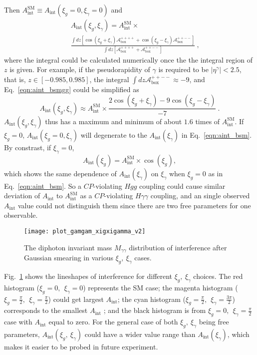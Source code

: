 \documentclass[twocolumn,
prd,amssymb,amsmath,preprintnumbers,
floatfix,aps,nofootinbib]{revtex4-1}
\newcommand{\beq}{\begin{equation}}
\newcommand{\eeq}{\end{equation}}
\newcommand{\bea}{\begin{eqnarray}}
\newcommand{\eea}{\end{eqnarray}}
\begin{document}
Then $A_{\text{int}}^{\text{SM}}\equiv A_{\text{int}}(\xi_g=0,\xi_\gamma=0)$ and
\bea
&& A_{\text{int}}(\xi_g,\xi_\gamma) = A_{\text{int}}^{\text{SM}}\times
\nonumber \\
&& \frac{\int dz[\cos(\xi_g+\xi_\gamma)\mathcal{A}_{\text{box}}^{++++}+\cos(\xi_g-\xi_\gamma)\mathcal{A}_{\text{box}}^{++--}]}{\int dz[\mathcal{A}_{\text{box}}^{++++}+\mathcal{A}_{\text{box}}^{++--}]}~,
\label{eqn:aint_bsmgg}
\eea
where the integral could be calculated numerically once the
the integral region of $z$ is given. For example,
if the pseudorapidity of $\gamma$ is required to be $|\eta^{\gamma}|<2.5$,
that is, $z\in [-0.985,0.985]$,
the integral $\int dz \mathcal{A}_{\text{box}}^{++--}\approx -9$,
and Eq.~\eqref{eqn:aint_bsmgg} could be simplified as
\beq
A_{\text{int}}(\xi_g,\xi_\gamma)\approx A_{\text{int}}^{\text{SM}}\times
\frac{2\cos(\xi_g+\xi_\gamma)-9\cos(\xi_g-\xi_\gamma)}
{-7}~.
\label{eqn:aint_bsmgg2}
\eeq
$A_{\text{int}}(\xi_g,\xi_\gamma)$ thus has a maximum and minimum
of about $1.6$ times of $A_{\text{int}}^{\text{SM}}$.
If $\xi_g=0$, $A_{\text{int}}(\xi_g=0,\xi_\gamma)$ will degenerate to the
$A_{\text{int}}(\xi_\gamma)$ in Eq.~\eqref{eqn:aint_bsm}.
By constrast, if $\xi_\gamma=0$,
\beq
A_{\text{int}}(\xi_g)= A_{\text{int}}^{\text{SM}}\times \cos(\xi_g),
\eeq
which shows the same dependence of $A_{\text{int}}(\xi_\gamma)$
on $\xi_\gamma$ when $\xi_g=0$ as in Eq.~\eqref{eqn:aint_bsm}.
So a $CP$-violating $Hgg$ coupling could cause similar deviation of
$A_{\text{int}}$ to $A_{\text{int}}^{\text{SM}}$ as a $CP$-violating $H\gamma\gamma$ coupling, and
an single observed $A_{\text{int}}$ value could not distinguish them
 since there are two free parameters for
one observable.

\begin{figure}[tbp]
\begin{center}
\texttt{[image: plot\_gamgam\_xigxigamma\_v2]}
\end{center}
\caption{ The diphoton invariant mass $M_{\gamma\gamma}$ distribution
of interference after Gaussian smearing
in various $\xi_g,~\xi_\gamma$ cases. }
\label{fig:xigxigamma}
\end{figure}


Fig.~\ref{fig:xigxigamma} shows the lineshapes of interference for different
$\xi_g,~\xi_\gamma$ choices.
The red histogram ($\xi_g=0,~~\xi_\gamma=0$) represents the SM case; the magenta histogram
($\xi_g=\frac{\pi}{2},~~\xi_\gamma=\frac{\pi}{2}$) could get largest $A_{\text{int}}$;
the cyan histogram ($\xi_g=\frac{\pi}{2},~~\xi_\gamma=\frac{3\pi}{2}$) corresponds
 to the smallest $A_{\text{int}}$ ; and the black histogram
is from $\xi_g=0,~~\xi_\gamma=\frac{\pi}{2}$ case with $A_{\text{int}}$ equal to zero.
 For the general case of both $\xi_g,~\xi_\gamma$ being free parameters,
$A_{\text{int}}(\xi_g,~\xi_\gamma)$ could have a wider value range than $A_{\text{int}}(\xi_\gamma)$, which makes it easier to be probed in future experiment.
\end{document}
